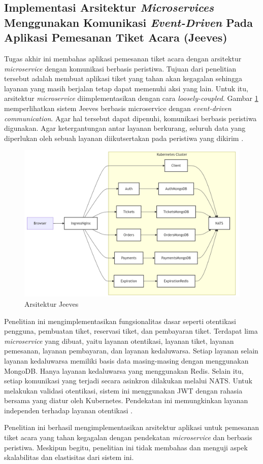 \subsection{Implementasi Arsitektur \textit{Microservices} Menggunakan Komunikasi \textit{Event-Driven} Pada Aplikasi Pemesanan Tiket Acara (Jeeves)}

Tugas akhir ini membahas aplikasi pemesanan tiket acara dengan arsitektur \textit{microservice} dengan komunikasi berbasis peristiwa. Tujuan dari penelitian tersebut adalah membuat aplikasi tiket yang tahan akan kegagalan sehingga layanan yang masih berjalan tetap dapat memenuhi aksi yang lain. Untuk itu, arsitektur \textit{microservice} diimplementasikan dengan cara \textit{loosely-coupled}. Gambar \ref{fig:jeeves-architecture} memperlihatkan sistem Jeeves berbasis microservice dengan \textit{event-driven communication}. Agar hal tersebut dapat dipenuhi, komunikasi berbasis peristiwa digunakan. Agar ketergantungan antar layanan berkurang, seluruh data yang diperlukan oleh sebuah layanan diikutsertakan pada peristiwa yang dikirim \parencite{microservicesEventDriven}.

\begin{figure}[H]
    \centering
    \includegraphics[width=1\textwidth]{resources/chapter-2/jeeves.png}
    \caption{Arsitektur Jeeves \parencite{microservicesEventDriven}}
    \label{fig:jeeves-architecture}
\end{figure}

Penelitian ini mengimplementasikan fungsionalitas dasar seperti otentikasi pengguna, pembuatan tiket, reservasi tiket, dan pembayaran tiket. Terdapat lima \textit{microservice} yang dibuat, yaitu layanan otentikasi, layanan tiket, layanan pemesanan, layanan pembayaran, dan layanan kedaluwarsa. Setiap layanan selain layanan kedaluwarsa memiliki basis data masing-masing dengan menggunakan MongoDB. Hanya layanan kedaluwarsa yang menggunakan Redis. Selain itu, setiap komunikasi yang terjadi secara asinkron dilakukan melalui NATS. Untuk melakukan validasi otentikasi, sistem ini menggunakan JWT dengan rahasia bersama yang diatur oleh Kubernetes. Pendekatan ini memungkinkan layanan independen terhadap layanan otentikasi \parencite{microservicesEventDriven}.

Penelitian ini berhasil mengimplementasikan arsitektur aplikasi untuk pemesanan tiket acara yang tahan kegagalan dengan pendekatan \textit{microservice} dan berbasis peristiwa. Meskipun begitu, penelitian ini tidak membahas dan menguji aspek skalabilitas dan elastisitas dari sistem ini.
